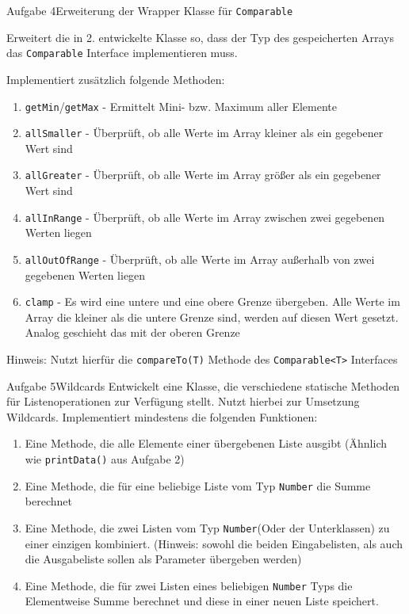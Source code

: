 \begin{frame}[allowframebreaks]{Aufgabe 4}{Erweiterung der Wrapper Klasse für \texttt{Comparable}}

    Erweitert die in 2. entwickelte Klasse so, dass der Typ des gespeicherten Arrays das \texttt{Comparable} Interface implementieren muss.

    Implementiert zusätzlich folgende Methoden:
    \begin{enumerate}
        \item \texttt{getMin}/\texttt{getMax} - Ermittelt Mini- bzw. Maximum aller Elemente
        \item \texttt{allSmaller} - Überprüft, ob alle Werte im Array kleiner als ein gegebener Wert sind
        \item \texttt{allGreater} - Überprüft, ob alle Werte im Array größer als ein gegebener Wert sind
        \item \texttt{allInRange} - Überprüft, ob alle Werte im Array zwischen zwei gegebenen Werten liegen
        \item \texttt{allOutOfRange} - Überprüft, ob alle Werte im Array außerhalb von zwei gegebenen Werten liegen
        \item \texttt{clamp} - Es wird eine untere und eine obere Grenze übergeben. Alle Werte im Array die kleiner als die untere Grenze sind, werden auf diesen Wert gesetzt. Analog geschieht das mit der oberen Grenze
    \end{enumerate}

    Hinweis: Nutzt hierfür die \texttt{compareTo(T)} Methode des \texttt{Comparable<T>} Interfaces
\end{frame}

\begin{frame}[fragile]{Aufgabe 5}{Wildcards}
Entwickelt eine Klasse, die verschiedene statische Methoden für Listenoperationen zur Verfügung stellt. Nutzt hierbei zur Umsetzung Wildcards.
Implementiert mindestens die folgenden Funktionen:

\begin{enumerate}
    \item Eine Methode, die alle Elemente einer übergebenen Liste ausgibt (Ähnlich wie \texttt{printData()} aus Aufgabe 2)
    \item Eine Methode, die für eine beliebige Liste vom Typ \texttt{Number} die Summe berechnet
    \item Eine Methode, die zwei Listen vom Typ \texttt{Number}(Oder der Unterklassen) zu einer einzigen kombiniert. (Hinweis: sowohl die beiden Eingabelisten, 
    als auch die Ausgabeliste sollen als Parameter übergeben werden)
    \item Eine Methode, die für zwei Listen eines beliebigen \texttt{Number} Typs die Elementweise Summe berechnet und diese in einer neuen Liste speichert.
\end{enumerate}
\end{frame}